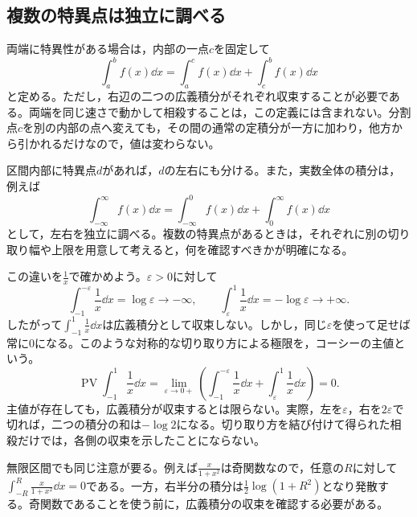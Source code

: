 \subsection{複数の特異点は独立に調べる}

両端に特異性がある場合は，内部の一点$c$を固定して
\[
 \int_a^bf(x)\dd x
 =\int_a^cf(x)\dd x+\int_c^bf(x)\dd x
\]
と定める。ただし，右辺の二つの広義積分がそれぞれ収束することが必要である。両端を同じ速さで動かして相殺することは，この定義には含まれない。分割点$c$を別の内部の点へ変えても，その間の通常の定積分が一方に加わり，他方から引かれるだけなので，値は変わらない。

区間内部に特異点$d$があれば，$d$の左右にも分ける。また，実数全体の積分は，例えば
\[
 \int_{-\infty}^{\infty}f(x)\dd x
 =\int_{-\infty}^{0}f(x)\dd x+\int_0^{\infty}f(x)\dd x
\]
として，左右を独立に調べる。複数の特異点があるときは，それぞれに別の切り取り幅や上限を用意して考えると，何を確認すべきかが明確になる。

この違いを$\frac1x$で確かめよう。$\varepsilon>0$に対して
\[
 \int_{-1}^{-\varepsilon}\frac1x\dd x=\log\varepsilon\longrightarrow-\infty,
 \qquad
 \int_{\varepsilon}^{1}\frac1x\dd x=-\log\varepsilon\longrightarrow+\infty.
\]
したがって$\int_{-1}^1\frac1x\dd x$は広義積分として収束しない。しかし，同じ$\varepsilon$を使って足せば常に$0$になる。このような対称的な切り取り方による極限を，コーシーの主値という。
\[
 \operatorname{PV}\int_{-1}^1\frac1x\dd x
 =\lim_{\varepsilon\to0+}
 \left(\int_{-1}^{-\varepsilon}\frac1x\dd x
       +\int_{\varepsilon}^{1}\frac1x\dd x\right)=0.
\]
主値が存在しても，広義積分が収束するとは限らない。実際，左を$\varepsilon$，右を$2\varepsilon$で切れば，二つの積分の和は$-\log2$になる。切り取り方を結び付けて得られた相殺だけでは，各側の収束を示したことにならない。

無限区間でも同じ注意が要る。例えば$\frac{x}{1+x^2}$は奇関数なので，任意の$R$に対して$\int_{-R}^R\frac{x}{1+x^2}\dd x=0$である。一方，右半分の積分は$\frac12\log(1+R^2)$となり発散する。奇関数であることを使う前に，広義積分の収束を確認する必要がある。

